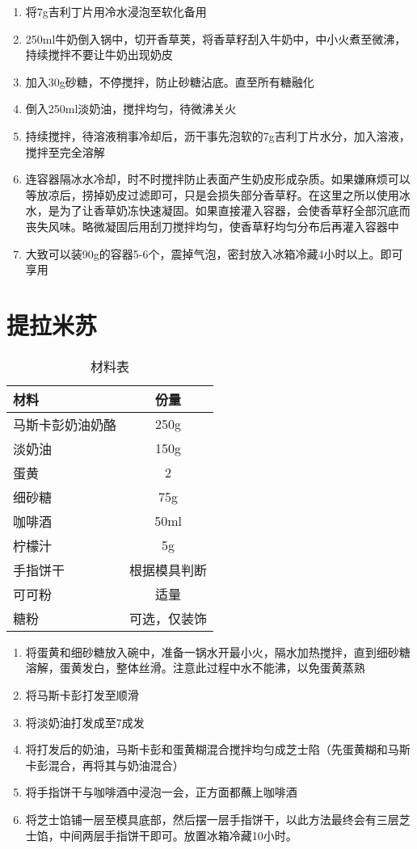 \begin{enumerate}
    \item 将7g吉利丁片用冷水浸泡至软化备用
    \item 250ml牛奶倒入锅中，切开香草荚，将香草籽刮入牛奶中，中小火煮至微沸，持续搅拌不要让牛奶出现奶皮
    \item 加入30g砂糖，不停搅拌，防止砂糖沾底。直至所有糖融化
    \item 倒入250ml淡奶油，搅拌均匀，待微沸关火
    \item 持续搅拌，待溶液稍事冷却后，沥干事先泡软的7g吉利丁片水分，加入溶液，搅拌至完全溶解
    \item 连容器隔冰水冷却，时不时搅拌防止表面产生奶皮形成杂质。如果嫌麻烦可以等放凉后，捞掉奶皮过滤即可，只是会损失部分香草籽。在这里之所以使用冰水，是为了让香草奶冻快速凝固。如果直接灌入容器，会使香草籽全部沉底而丧失风味。略微凝固后用刮刀搅拌均匀，使香草籽均匀分布后再灌入容器中
    \item 大致可以装90g的容器5-6个，震掉气泡，密封放入冰箱冷藏4小时以上。即可享用
\end{enumerate}





\section{提拉米苏}

\begin{table}[H]
    \centering
    \begin{tabular}{|l||c|}\hline
     \textbf{材料}    &  \textbf{份量}\\ \hline\hline
    马斯卡彭奶油奶酪 & 250g \\ \hline
    淡奶油 &  150g \\ \hline
    蛋黄 & 2 \\ \hline
    细砂糖 & 75g \\ \hline
    咖啡酒 & 50ml \\ \hline
    柠檬汁 & 5g \\ \hline
    手指饼干 & 根据模具判断 \\ \hline
    可可粉 & 适量 \\ \hline
    糖粉 & 可选，仅装饰 \\ \hline
    \end{tabular}
    \caption{材料表}
\end{table}

\begin{enumerate}
    \item 将蛋黄和细砂糖放入碗中，准备一锅水开最小火，隔水加热搅拌，直到细砂糖溶解，蛋黄发白，整体丝滑。注意此过程中水不能沸，以免蛋黄蒸熟
    \item 将马斯卡彭打发至顺滑
    \item 将淡奶油打发成至7成发
    \item 将打发后的奶油，马斯卡彭和蛋黄糊混合搅拌均匀成芝士陷（先蛋黄糊和马斯卡彭混合，再将其与奶油混合）
    \item 将手指饼干与咖啡酒中浸泡一会，正方面都蘸上咖啡酒
    \item 将芝士馅铺一层至模具底部，然后摆一层手指饼干，以此方法最终会有三层芝士馅，中间两层手指饼干即可。放置冰箱冷藏10小时。
\end{enumerate}



